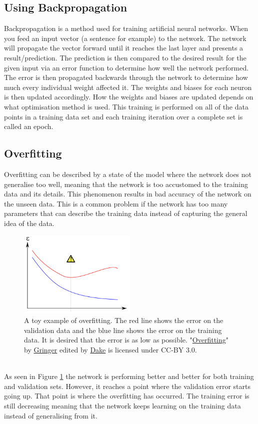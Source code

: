 \subsection{Using Backpropagation}\label{sec:backpropagation}
Backpropagation is a method used for training artificial neural networks. When you feed an input vector (a sentence for example) to the network. The network will propagate the vector forward until it reaches the last layer and presents a result/prediction. The prediction is then compared to the desired result for the given input via an error function to determine how well the network performed. The error is then propagated backwards through the network to determine how much every individual weight affected it. The weights and biases for each neuron is then updated accordingly. How the weights and biases are updated depends on what optimisation method is used. This training is performed on all of the data points in a training data set and each training iteration over a complete set is called an epoch.

\subsection{Overfitting}\label{sec:overfitting}
Overfitting can be described by a state of the model where the network does not generalise too well, meaning that the network is too accustomed to the training data and its details. This phenomenon results in bad accuracy of the network on the unseen data. This is a common problem if the network has too many parameters that can describe the training data instead of capturing the general idea of the data.
\begin{figure}[h]
    \centering
    \includegraphics[width=0.5\textwidth]{figure/ann/overfitting}
    \caption{A toy example of overfitting. The red line shows the error on the validation data and the blue line shows the error on the training data. It is desired that the error is as low as possible. 
    "\href{https://en.wikipedia.org/wiki/Overfitting\#/media/File:Overfitting_svg.svg}{Overfitting}" by
    \href{https://commons.wikimedia.org/wiki/User:Gringer}{Gringer} edited by
    \href{https://commons.wikimedia.org/wiki/User\:Dake}{Dake} is licensed under CC-BY 3.0.}
    \label{fig:overfitting}
\end{figure}
\\
As seen in Figure \ref{fig:overfitting} the network is performing better and better for both training and validation sets. However, it reaches a point where the validation error starts going up. That point is where the overfitting has occurred. The training error is still decreasing meaning that the network keeps learning on the training data instead of generalising from it. 

